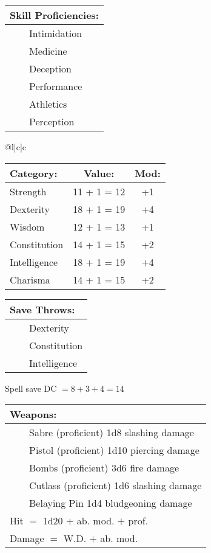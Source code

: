 \documentclass[11pt]{article}
\newcommand{\tabitem}{~~\llap{--}~~}
\begin{document}
\begin{multicols}{2}
\vspace{2mm}

\noindent \begin{tabularx}{\linewidth}{@{}l}
{\Large \textbf{Skill Proficiencies:}} \\
\hline
\tabitem Intimidation \\
\tabitem Medicine \\
\tabitem Deception \\
\tabitem Performance \\
\tabitem Athletics \\
\tabitem Perception
		\end{tabularx}

\vspace{4mm}

\noindent \begin{tabularx}{\linewidth}{@{}l|c|c}
 \\
\hline
		\end{tabularx}
\noindent \begin{tabular}{@{}l|c|c}
\textbf{Category:} 			& \textbf{Value:} 	& \textbf{Mod:} \\
\hline
Strength 					& 11 + 1 = 12		& +1		\\
Dexterity 					& 18 + 1 = 19 		& +4		\\
Wisdom 						& 12 + 1 = 13		& +1		\\
Constitution 				& 14 + 1 = 15 		& +2		\\
Intelligence 				& 18 + 1 = 19 		& +4		\\
Charisma 					& 14 + 1 = 15		& +2
		\end{tabular}

\vspace{4mm}

\noindent \begin{tabularx}{\linewidth}{@{}l}
{\Large \textbf{Save Throws:}} \\
\hline
\tabitem Dexterity \\
\tabitem Constitution \\
\tabitem Intelligence \\
		\end{tabularx}
\noindent Spell save DC $= 8 + 3 + 4 = 14$

\vspace{4mm}

\noindent \begin{tabularx}{\linewidth}{@{}l}
{\Large \textbf{Weapons:}} \\
\hline
\tabitem Sabre (proficient) 1d8 slashing damage \\
\tabitem Pistol (proficient) 1d10 piercing damage \\
\tabitem Bombs (proficient) 3d6 fire damage \\
\tabitem Cutlass (proficient) 1d6 slashing damage \\
\tabitem Belaying Pin 1d4 bludgeoning damage \\
Hit $=$ 1d20 $+$ ab. mod. $+$ prof. \\
Damage $=$ W.D. $+$ ab. mod.
		\end{tabularx}


\end{multicols}
\end{document}
